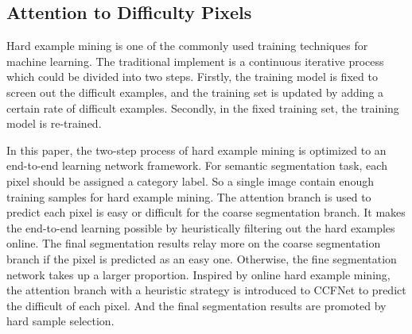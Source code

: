 \documentclass[10.5pt,compsoc]{TsT}
\theoremstyle{mystyle}
\begin{document}
{%


\subsection{Attention to Difficulty Pixels}
\label{s:attention}
\noindent


Hard example mining is one of the commonly used training techniques for machine learning.
The traditional implement is a continuous iterative process which could be divided into two steps.
Firstly, the training model is fixed to screen out the difficult examples, and the training set is updated by adding a certain rate of difficult examples.
Secondly, in the fixed training set, the training model is re-trained.

In this paper, the two-step process of hard example mining is optimized to an end-to-end learning network framework.
For semantic segmentation task, each pixel should be assigned a category label.
So a single image contain enough training samples for hard example mining.
The attention branch is used to predict each pixel is easy or difficult for the coarse segmentation branch.
It makes the end-to-end learning possible by heuristically filtering out the hard examples online.
The final segmentation results relay more on the coarse segmentation branch if the pixel is predicted as an easy one.
Otherwise, the fine segmentation network takes up a larger proportion.
Inspired by online hard example mining, the attention branch with a heuristic strategy is introduced to CCFNet to predict the difficult of each pixel.
And the final segmentation results are promoted by hard sample selection.


}
\end{document}

